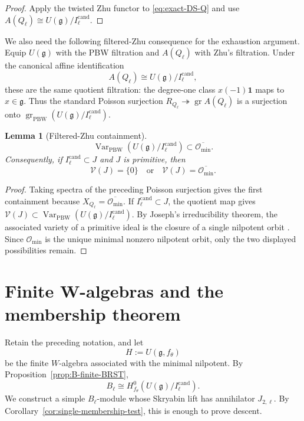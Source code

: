 \documentclass[11pt]{amsart}
\newtheorem{lemma}[theorem]{Lemma}
\theoremstyle{remark}
\numberwithin{equation}{section}
\begin{document}
\begin{proof}
Apply the twisted Zhu functor to \eqref{eq:exact-DS-Q} and use
\(A(Q_\ell)\cong U(\mathfrak g)/I_\ell^{\mathrm{cand}}\).
\end{proof}

We also need the following filtered-Zhu consequence for the exhaustion argument.
Equip \(U(\mathfrak g)\) with the PBW filtration and \(A(Q_\ell)\) with
Zhu's filtration.  Under the canonical affine identification
\[
   A(Q_\ell)\cong U(\mathfrak g)/I_\ell^{\mathrm{cand}},
\]
these are the same quotient filtration: the degree-one class
\(x(-1)\mathbf1\) maps to \(x\in\mathfrak g\).  Thus the standard Poisson
surjection
\(R_{Q_\ell}\twoheadrightarrow\operatorname{gr}A(Q_\ell)\)
\cite[Corollary~5.3]{ArakawaMoreau2018} is a surjection onto
\(\operatorname{gr}_{\mathrm{PBW}}(U(\mathfrak g)/I_\ell^{\mathrm{cand}})\).

\begin{lemma}[Filtered-Zhu containment]
\label{lem:filtered-Zhu-containment}
\begin{equation}
   \operatorname{Var}_{\mathrm{PBW}}
   \!\left(U(\mathfrak g)/I_\ell^{\mathrm{cand}}\right)
   \subset\overline{\mathcal O_{\min}}.
\end{equation}
Consequently, if \(I_\ell^{\mathrm{cand}}\subset J\) and \(J\) is
primitive, then
\[
   \mathcal V(J)=\{0\}
   \quad\text{or}\quad
   \mathcal V(J)=\overline{\mathcal O_{\min}}.
\]
\end{lemma}

\begin{proof}
Taking spectra of the preceding Poisson surjection gives the first
containment because
\(X_{Q_\ell}=\overline{\mathcal O_{\min}}\).  If
\(I_\ell^{\mathrm{cand}}\subset J\), the quotient map gives
\(\mathcal V(J)\subset
\operatorname{Var}_{\mathrm{PBW}}(U(\mathfrak g)/I_\ell^{\mathrm{cand}})\).
By Joseph's irreducibility theorem, the associated variety of a primitive
ideal is the closure of a single nilpotent orbit
\cite[Chapter~9]{Joseph1995}.  Since \(\mathcal O_{\min}\) is the unique
minimal nonzero nilpotent orbit, only the two displayed possibilities
remain.
\end{proof}
\section{Finite W-algebras and the membership theorem}
\label{sec:membership}

Retain the preceding notation, and let
\[
   H:=U(\mathfrak g,f_\theta)
\]
be the finite \(W\)-algebra associated with the minimal nilpotent.
By Proposition~\ref{prop:B-finite-BRST},
\begin{equation}
\label{eq:membership-B-finite-BRST}
   B_\ell
   \cong
   H^0_{f_\theta}
   \!\left(
      U(\mathfrak g)/I_\ell^{\mathrm{cand}}
   \right).
\end{equation}
We construct a simple \(B_\ell\)-module whose Skryabin lift has
annihilator \(J_{2,\ell}\).  By
Corollary~\ref{cor:single-membership-test}, this is enough to prove descent.
\end{document}
